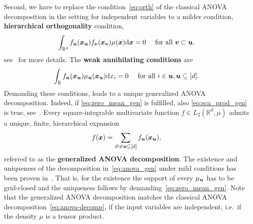 \documentclass{article}
\renewcommand{\vec}[1]{\ensuremath \mathbf{\boldsymbol{#1}}}
\newcommand{\x}{\ensuremath{\vec x}}
\newcommand{\R}{\ensuremath{\mathbb{R}}}
\newcommand{\dx}{\mathrm{d}}
\theoremstyle{definition}
\numberwithin{equation}{section}
\begin{document}
Second, we have to replace the condition~\eqref{eq:orth} of the classical ANOVA decomposition in the setting for independent variables to a milder condition, \textbf{hierarchical orthogonality} condition, 
\begin{equation}\label{eq:sca_prod_gen}
\int_{\R^d} f_{\vec u}(\x_{\vec u}) f_{\vec v}(\x_{\vec v}) \mu(\x) \dx \x = 0 \quad \text{ for all } \vec v \subset \vec u, 
\end{equation}
see~\cite{Ho07, Ra142} for more details.
The \textbf{weak annihilating conditions} are 
\begin{equation}\label{eq:zero_mean_gen}
\int_{\R} f_{\vec u}(\x_{\vec u}) \mu_{\vec u}(\x_{\vec u}) \dx x_i = 0 \quad \text{ for all } i \in \vec u, \vec u \subseteq [d].
\end{equation}
Demanding these conditions, leads to a unique generalized ANOVA decomposition. Indeed, if \eqref{eq:zero_mean_gen} is fulfilled, also \eqref{eq:sca_prod_gen} is true, see~\cite{Ho07}.
Every square-integrable multivariate
function $f\in L_2(\R^d,\mu)$ admits a unique, finite, hierarchical expansion 
\begin{equation}\label{eq:anova_gen}
f(\x) = \sum_{\varnothing \neq \vec u \subseteq [d]} f_{\vec u}(\x_{\vec u}),
\end{equation}
referred to as the \textbf{generalized ANOVA decomposition}. The existence and uniqueness of the decomposition in~\eqref{eq:anova_gen} under mild conditions has been proven in~\cite{ChGa12, Ho07, St94}. That is, for the existence the support of every $\mu_{\vec u}$ has to be grid-closed and the uniqueness follows by demanding~\eqref{eq:zero_mean_gen}. Note that the generalized ANOVA decomposition matches the classical ANOVA decomposition~\eqref{eq:anova-decomp}, if the input variables are independent, i.e.~if the density $\mu$ is a tensor product. \par
\end{document}
